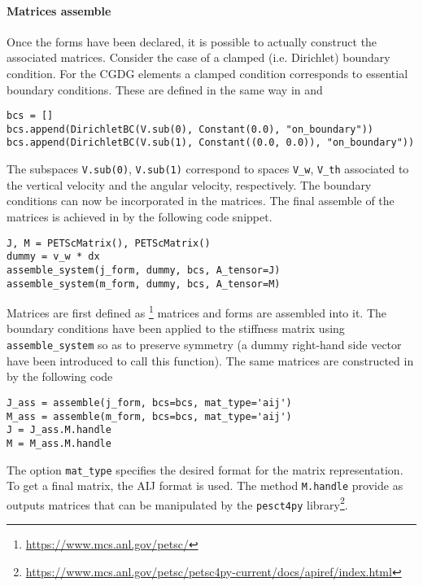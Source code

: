 \paragraph{Matrices assemble}
Once the forms have been declared, it is possible to actually construct the associated matrices. Consider the case of a clamped (i.e. Dirichlet) boundary condition. For the CGDG elements a clamped condition corresponds to essential boundary conditions. These are defined in the same way in \fenics and \firedrake
\begin{tcolorbox}[title = Dirichlet boundary conditions (\fenics \& \firedrake), coltitle=white, breakable, size=fbox, boxrule=1pt, pad at break*=1mm, enlarge top by=0.25em, enlarge bottom by=0.5em]
\begin{Verbatim}[tabsize=4]
bcs = []
bcs.append(DirichletBC(V.sub(0), Constant(0.0), "on_boundary"))
bcs.append(DirichletBC(V.sub(1), Constant((0.0, 0.0)), "on_boundary"))
\end{Verbatim}
\end{tcolorbox}
The subspaces \verb|V.sub(0)|, \verb|V.sub(1)| correspond to spaces \verb|V_w|, \verb|V_th| associated to the vertical velocity and the angular velocity, respectively. The boundary conditions can now be incorporated in the matrices. The final assemble of the matrices is achieved in \fenics by the following code snippet.
\begin{tcolorbox}[title = Matrices assembly in  \fenics, coltitle=black, breakable, size=fbox, boxrule=1pt, pad at break*=1mm, colframe=red, enlarge top by=0.25em, enlarge bottom by=0.5em]
\begin{Verbatim}[tabsize=4]
J, M = PETScMatrix(), PETScMatrix()
dummy = v_w * dx
assemble_system(j_form, dummy, bcs, A_tensor=J)
assemble_system(m_form, dummy, bcs, A_tensor=M)
\end{Verbatim}
\end{tcolorbox}
Matrices are first defined as {}\footnote{\url{https://www.mcs.anl.gov/petsc/}} matrices and forms are assembled into it. The boundary conditions have been applied to the stiffness matrix using \verb|assemble_system| so as to preserve symmetry (a dummy right-hand side vector have been introduced to call this function). The same matrices are constructed in \firedrake by the following code
\begin{tcolorbox}[title = Matrices assembly in  \firedrake, coltitle=black, breakable, size=fbox, boxrule=1pt, pad at break*=1mm, colframe=cyan, enlarge top by=0.25em, enlarge bottom by=0.5em]
\begin{Verbatim}[tabsize=4]
J_ass = assemble(j_form, bcs=bcs, mat_type='aij')
M_ass = assemble(m_form, bcs=bcs, mat_type='aij')
J = J_ass.M.handle
M = M_ass.M.handle
\end{Verbatim}
\end{tcolorbox}
The option \verb|mat_type| specifies the desired format for the matrix representation. To get a final {} matrix, the AIJ format is used. The method \verb|M.handle| provide as outputs {} matrices that can be manipulated by the \verb|pesct4py| library\footnote{\url{https://www.mcs.anl.gov/petsc/petsc4py-current/docs/apiref/index.html}}. \\


